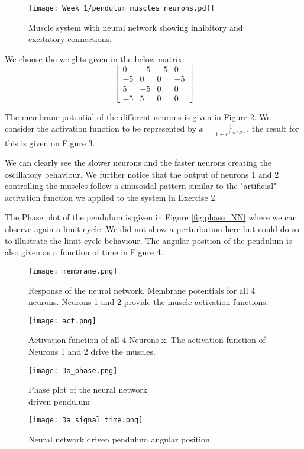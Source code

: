 \documentclass[11pt]{article}
\begin{document}
\begin{figure}[!h]
\centering
\texttt{[image: Week\_1/pendulum\_muscles\_neurons.pdf]}

\caption{Muscle system with neural network showing inhibitory and excitatory connections.}
\label{fig:NNmuscle}
\end{figure}

\noindent We choose the weights given in the below matrix:
\[\begin{bmatrix}
 0   & -5 & -5 & 0 \\
-5  & 0 & 0 & -5 \\
 5  & -5 & 0 & 0 \\
-5  & 5 & 0 & 0
\end{bmatrix}\]

The membrane potential of the different neurons is given in Figure \ref{fig:neurons}. We consider the activation function to be represented by \(x = \frac{1}{1+e^(m*D)}\), the result for this is given on Figure \ref{fig:act}. 

We can clearly see the slower neurons and the faster neurons creating the oscillatory behaviour. We further notice that the output of neurons 1 and 2 controlling the muscles follow a sinusoidal pattern similar to the "artificial" activation function we applied to the system in Exercise 2. 

The Phase plot of the pendulum is given in Figure \ref{fig:phase_NN} where we can observe again a limit cycle. We did not show a perturbation here but could do so to illustrate the limit cycle behaviour. The angular position of the pendulum is also given as a function of time in Figure \ref{fig:time_NN}.
\newpage
\begin{figure}[!h]
\centering
\texttt{[image: membrane.png]}

\caption{Response of the neural network. Membrane potentials for all 4 neurons. Neurons 1 and 2 provide the muscle activation functions.}
\label{fig:neurons}
\end{figure}

\begin{figure}[!h]
\centering
\texttt{[image: act.png]}

\caption{Activation function of all 4 Neurons x. The activation function of Neurons 1 and 2 drive the muscles.}
\label{fig:act}
\end{figure}

\begin{figure}[!h]
\centering
{}
\texttt{[image: 3a\_phase.png]}

\caption{Phase plot of the neural network \\ driven pendulum}
\label{fig:phase_NN}
\endminipage
{}
\centering
\texttt{[image: 3a\_signal\_time.png]}

\caption{Neural network driven pendulum angular position }
\label{fig:time_NN}
\endminipage
\end{figure}
\newpage
\end{document}
